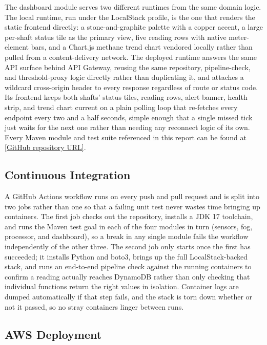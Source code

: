 \documentclass[conference]{IEEEtran}
\begin{document}
The dashboard module serves two different runtimes from the same domain logic. The local runtime, run under the LocalStack profile, is the one that renders the static frontend directly: a stone-and-graphite palette with a copper accent, a large per-shaft status tile as the primary view, five reading rows with native meter-element bars, and a Chart.js methane trend chart vendored locally rather than pulled from a content-delivery network. The deployed runtime answers the same API surface behind API Gateway, reusing the same repository, pipeline-check, and threshold-proxy logic directly rather than duplicating it, and attaches a wildcard cross-origin header to every response regardless of route or status code. Its frontend keeps both shafts' status tiles, reading rows, alert banner, health strip, and trend chart current on a plain polling loop that re-fetches every endpoint every two and a half seconds, simple enough that a single missed tick just waits for the next one rather than needing any reconnect logic of its own. Every Maven module and test suite referenced in this report can be found at \href{[GitHub repository URL]}{[GitHub repository URL]}.

\subsection{Continuous Integration}

A GitHub Actions workflow runs on every push and pull request and is split into two jobs rather than one so that a failing unit test never wastes time bringing up containers. The first job checks out the repository, installs a JDK 17 toolchain, and runs the Maven test goal in each of the four modules in turn (sensors, fog, processor, and dashboard), so a break in any single module fails the workflow independently of the other three. The second job only starts once the first has succeeded; it installs Python and boto3, brings up the full LocalStack-backed stack, and runs an end-to-end pipeline check against the running containers to confirm a reading actually reaches DynamoDB rather than only checking that individual functions return the right values in isolation. Container logs are dumped automatically if that step fails, and the stack is torn down whether or not it passed, so no stray containers linger between runs.

\subsection{AWS Deployment}
\end{document}
